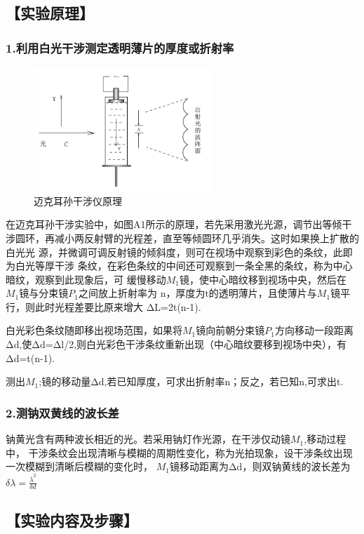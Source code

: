 \documentclass[12pt,a4paper,UTF8]{ctexart}
\begin{document}
\subsection*{【实验原理】}
\subsubsection*{1.利用白光干涉测定透明薄片的厚度或折射率}

\begin{figure}[htbp]
	\centering
	\includegraphics[width=0.6\textwidth]{img//1.jpg}
	\caption{迈克耳孙干涉仪原理}
\end{figure}


在迈克耳孙干涉实验中，如图A1所示的原理，若先采用激光光源，调节出等倾干
涉圆环，再减小两反射臂的光程差，直至等倾圆环几乎消失。这时如果换上扩散的白光光
源，并微调可调反射镜的倾斜度，则可在视场中观察到彩色的条纹，此即为白光等厚干涉
条纹，在彩色条纹的中间还可观察到一条全黑的条纹，称为中心暗纹，观察到此现象后，可
缓慢移动$M_1$镜，使中心暗纹移到视场中央，然后在$M_1$镜与分束镜$P_1$之间放上折射率为
n，厚度为t的透明薄片，且使薄片与$M_1$镜平行，则此时光程差要比原来增大
ΔL=2t(n-1).

白光彩色条纹随即移出视场范围，如果将$M_1$镜向前朝分束镜$P_1$方向移动一段距离
Δd,使Δd=Δl/2,则白光彩色干涉条纹重新出现（中心暗纹要移到视场中央），有
Δd=t(n-1).

测出$M_1$;镜的移动量Δd,若已知厚度，可求出折射率n；反之，若已知n,可求出t.

\subsubsection*{2.测钠双黄线的波长差}
钠黄光含有两种波长相近的光。若采用钠灯作光源，在干涉仅动镜$M_1$,移动过程中，
干涉条纹会出现清晰与模糊的周期性变化，称为光拍现象，设干涉条纹出现一次模糊到清晰后模糊的变化时，
$M_1$镜移动距离为Δd，则双钠黄线的波长差为$\delta\lambda =\frac {\overline{\lambda} ^{2}}{\delta d}$

\subsection*{【实验内容及步骤】}
\end{document}
